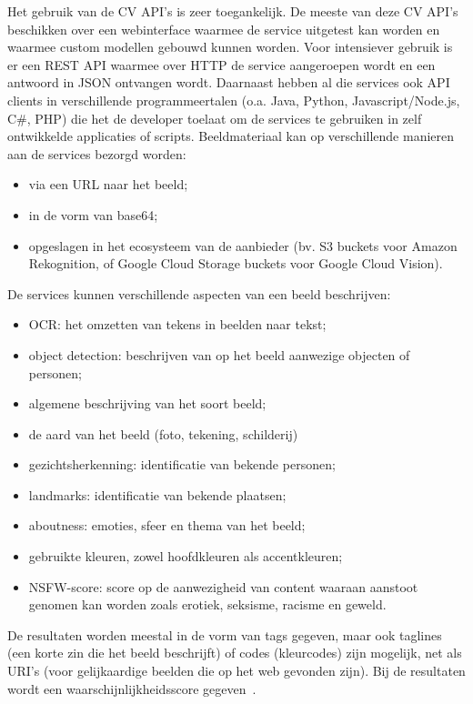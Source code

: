 Het gebruik van de CV API’s is zeer toegankelijk. De meeste van deze CV API’s beschikken over een webinterface waarmee de service uitgetest kan worden en waarmee custom modellen gebouwd kunnen worden. Voor intensiever gebruik is er een REST API waarmee over HTTP de service aangeroepen wordt en een antwoord in JSON ontvangen wordt. Daarnaast hebben al die services ook API clients in verschillende programmeertalen (o.a. Java, Python, Javascript/Node.js, C\#, PHP) die het de developer toelaat om de services te gebruiken in zelf ontwikkelde applicaties of scripts. Beeldmateriaal kan op verschillende manieren aan de services bezorgd worden:
\begin{itemize}
	\item via een URL naar het beeld;
	\item in de vorm van base64;
	\item opgeslagen in het ecosysteem van de aanbieder (bv. S3 buckets voor Amazon Rekognition, of Google Cloud Storage buckets voor Google Cloud Vision).
\end{itemize}

De services kunnen verschillende aspecten van een beeld beschrijven:
\begin{itemize}
	\item OCR: het omzetten van tekens in beelden naar tekst;
	\item object detection: beschrijven van op het beeld aanwezige objecten of personen;
	\item algemene beschrijving van het soort beeld;
	\item de aard van het beeld (foto, tekening, schilderij)
	\item gezichtsherkenning: identificatie van bekende personen;
	\item landmarks: identificatie van bekende plaatsen;
	\item aboutness: emoties, sfeer en thema van het beeld;
	\item gebruikte kleuren, zowel hoofdkleuren als accentkleuren;
	\item NSFW-score: score op de aanwezigheid van content waaraan aanstoot genomen kan worden zoals erotiek, seksisme, racisme en geweld.
\end{itemize}

De resultaten worden meestal in de vorm van tags gegeven, maar ook taglines (een korte zin die het beeld beschrijft) of codes (kleurcodes) zijn mogelijk, net als URI’s (voor gelijkaardige beelden die op het web gevonden zijn). Bij de resultaten wordt een waarschijnlijkheidsscore gegeven~\autocite{Vanstappen2019}.

